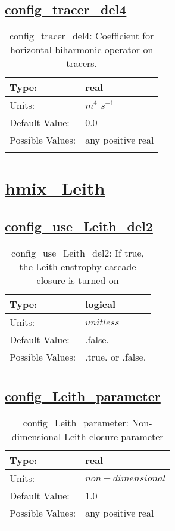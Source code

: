 \subsection[config\_tracer\_del4]{\hyperref[sec:nm_tab_hmix_del4]{config\_tracer\_del4}}
\label{subsec:nm_sec_config_tracer_del4}
\begin{center}
\begin{longtable}{| p{2.0in} | p{4.0in} |}
    \hline
    Type: & real \\
    \hline
    Units: & $m^4$ $s^{-1}$ \\
    \hline
    Default Value: & 0.0 \\
    \hline
    Possible Values: & any positive real \\
    \hline
    \caption{config\_tracer\_del4: Coefficient for horizontal biharmonic operator on tracers.}
\end{longtable}
\end{center}
\section[hmix\_Leith]{\hyperref[sec:nm_tab_hmix_Leith]{hmix\_Leith}}
\label{sec:nm_sec_hmix_Leith}
\subsection[config\_use\_Leith\_del2]{\hyperref[sec:nm_tab_hmix_Leith]{config\_use\_Leith\_del2}}
\label{subsec:nm_sec_config_use_Leith_del2}
\begin{center}
\begin{longtable}{| p{2.0in} | p{4.0in} |}
    \hline
    Type: & logical \\
    \hline
    Units: & $unitless$ \\
    \hline
    Default Value: & .false. \\
    \hline
    Possible Values: & .true. or .false. \\
    \hline
    \caption{config\_use\_Leith\_del2: If true, the Leith enstrophy-cascade closure is turned on}
\end{longtable}
\end{center}
\subsection[config\_Leith\_parameter]{\hyperref[sec:nm_tab_hmix_Leith]{config\_Leith\_parameter}}
\label{subsec:nm_sec_config_Leith_parameter}
\begin{center}
\begin{longtable}{| p{2.0in} | p{4.0in} |}
    \hline
    Type: & real \\
    \hline
    Units: & $non-dimensional$ \\
    \hline
    Default Value: & 1.0 \\
    \hline
    Possible Values: & any positive real \\
    \hline
    \caption{config\_Leith\_parameter: Non-dimensional Leith closure parameter}
\end{longtable}
\end{center}
